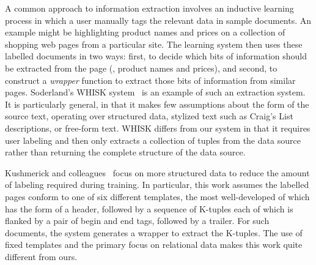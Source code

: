 A common approach to information extraction involves an inductive
learning process in which a user manually tags the relevant data in sample documents.
An example might be highlighting product names and prices on a
collection of shopping web pages from a particular site.  The learning
system then uses these labelled documents in two ways: first, to
decide which bits of information should be extracted from the page
(\ie, product names and prices), and second, to construct a
\textit{wrapper} function to extract those bits of information from
similar pages.  Soderland's WHISK system~\cite{soderland:whisk} is an
example of such an extraction system.  It is particularly general, in
that it makes few assumptions about the form of the source text,
operating over structured data, stylized text such as Craig's List
descriptions, or free-form text.  WHISK differs from our system in
that it requires user labeling and then only extracts a collection of
tuples from the data source rather than returning the complete
structure of the data source.


Kushmerick and
colleagues~\cite{kushmerick-phd1997,KushmerickWD97:Wrapper} focus on
more structured data to reduce the amount of labeling required during
training.  In particular, this work assumes the labelled pages conform
to one of six different templates, the most well-developed of which
has the form of a header, followed by a sequence of K-tuples each of
which is flanked by a pair of begin and end tags, followed by a
trailer.  For such documents, the system generates a wrapper to
extract the K-tuples.  
The use of fixed templates and the primary focus on relational data makes this
work quite different from ours.

